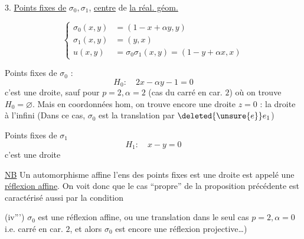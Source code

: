 3. \uline{Points fixes de} $\sigma_0,\sigma_1$, \uline{centre} de \uline{la réal. géom.}

\[ \left\{\begin{aligned}\sigma_0(x,y)&=(1-x+\alpha y,y)\\
\sigma_1(x,y)&=(y,x)\\
u(x,y)&=\sigma_0\sigma_1(x,y)=(1-y+\alpha x,x)\end{aligned}\right. \tag*{(26)} \]


Points fixes de $\sigma_0$ :
\[ H_0:\quad 2x-\alpha y-1=0 \tag*{(27)} \]
c'est une droite,
sauf pour $p=2,\alpha=2$
(cas du carré en car. $2$)
où on trouve $H_0=\varnothing$. Mais
 en coordonnées hom, on
trouve encore une droite
$z=0$ : la droite à l'infini
(Dans ce cas, $\sigma_0$ est la translation par $\deleted{\unsure{e}} e_1$)

Points fixes de $\sigma_1$
\[ H_1:\quad x-y=0 \tag*{(28)} \]
c'est une droite

\uline{NB} Un automorphisme affine   l'ens des
points fixes est une droite est appelé une
\uline{réflexion affine}. On voit donc que le
cas ``propre'' de la proposition précédente est
caractérisé aussi par la condition

(iv''') $\sigma_0$ est une réflexion affine, ou  une
translation   dans le seul cas
$p=2,\alpha=0$ i.e. carré en car. $2$, et alors $\sigma_0$ est
encore une réflexion projective\ldots)
